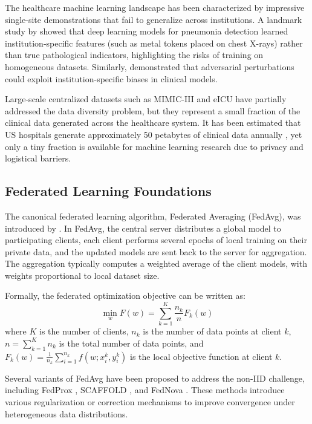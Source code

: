 \documentclass[12pt,letterpaper]{article}
\begin{document}
The healthcare machine learning landscape has been characterized by impressive single-site demonstrations that fail to generalize across institutions. A landmark study by \citet{Zech2018} showed that deep learning models for pneumonia detection learned institution-specific features (such as metal tokens placed on chest X-rays) rather than true pathological indicators, highlighting the risks of training on homogeneous datasets. Similarly, \citet{Finlayson2019} demonstrated that adversarial perturbations could exploit institution-specific biases in clinical models.

Large-scale centralized datasets such as MIMIC-III \citep{Johnson2016} and eICU \citep{Pollard2018} have partially addressed the data diversity problem, but they represent a small fraction of the clinical data generated across the healthcare system. It has been estimated that US hospitals generate approximately 50 petabytes of clinical data annually \citep{Raghupathi2014}, yet only a tiny fraction is available for machine learning research due to privacy and logistical barriers.

\subsection{Federated Learning Foundations}

The canonical federated learning algorithm, Federated Averaging (FedAvg), was introduced by \citet{McMahan2017}. In FedAvg, the central server distributes a global model to participating clients, each client performs several epochs of local training on their private data, and the updated models are sent back to the server for aggregation. The aggregation typically computes a weighted average of the client models, with weights proportional to local dataset size.

Formally, the federated optimization objective can be written as:
\begin{equation}
\min_{w} F(w) = \sum_{k=1}^{K} \frac{n_k}{n} F_k(w)
\label{eq:fedavg}
\end{equation}
where $K$ is the number of clients, $n_k$ is the number of data points at client $k$, $n = \sum_{k=1}^{K} n_k$ is the total number of data points, and $F_k(w) = \frac{1}{n_k} \sum_{i=1}^{n_k} f(w; x_i^k, y_i^k)$ is the local objective function at client $k$.

Several variants of FedAvg have been proposed to address the non-IID challenge, including FedProx \citep{Li2020}, SCAFFOLD \citep{Karimireddy2020}, and FedNova \citep{Wang2020}. These methods introduce various regularization or correction mechanisms to improve convergence under heterogeneous data distributions.
\end{document}
